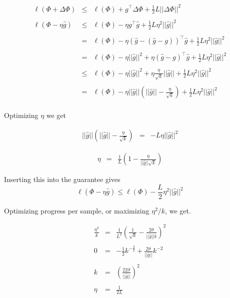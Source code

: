 {\begin{eqnarray*}
 \ell(\Phi + \Delta \Phi) & \leq &   \ell(\Phi) + g^\top \Delta \Phi + \frac{1}{2} L ||\Delta \Phi||^2 \\
  \\
\ell(\Phi - \eta\widehat{g}) & \leq & \ell(\Phi) - \eta g^\top \widehat{g} + \frac{1}{2}L \eta^2 ||\widehat{g}||^2\\
  \\
  & = &  \ell(\Phi) - \eta (\widehat{g} - (\widehat{g} -g))^\top \widehat{g} + \frac{1}{2}L\eta^2 ||\widehat{g}||^2 \\
  \\
  & = &  \ell(\Phi) - \eta ||\widehat{g}||^2 + \eta(\widehat{g} -g)^\top \widehat{g} + \frac{1}{2}L \eta^2 ||\widehat{g}||^2 \\
  \\
  & \leq &  \ell(\Phi) - \eta ||\widehat{g}||^2 + \eta\frac{\eta}{\sqrt{k}}||\widehat{g}|| + \frac{1}{2}L \eta^2 ||\widehat{g}||^2 \\
  \\
  & = & \ell(\Phi) - \eta ||\widehat{g}||\left(||\widehat{g}|| - \frac{\eta}{\sqrt{k}} \right)  + \frac{1}{2}L \eta^2 ||\widehat{g}||^2 \\
\end{eqnarray*}


Optimizing $\eta$ we get

\begin{eqnarray*}
 ||\widehat{g}||\left(||\widehat{g}|| - \frac{\eta}{\sqrt{k}} \right) & = & - L \eta ||\widehat{g}||^2
\end{eqnarray*}


\begin{eqnarray*}
\eta & = & \frac{1}{L}\left(1 - \frac{\eta}{||\widehat{g}||\sqrt{k}}\right)
\end{eqnarray*}

\vfill
Inserting this into the guarantee gives
$$\ell(\Phi - \eta \widehat{g}) \leq \ell(\Phi) - \frac{L}{2}\eta^2||\widehat{g}||^2$$


Optimizing progress per sample, or maximizing $\eta^2/k$, we get.

\begin{eqnarray*}
\frac{\eta^2}{k} & = & \frac{1}{L^2}\left(\frac{1}{\sqrt{k}} - \frac{2\hat{\sigma}}{||\widehat{g}||k}\right)^2 \\
\\
0 & = &  - \frac{1}{2} k^{-\frac{3}{2}} + \frac{2\hat{\sigma}}{||\widehat{g}||} k^{-2} \nonumber \\
\\
k & = & \left(\frac{22\hat{\sigma}}{||\widehat{g}||}\right)^2 \\
\\
\eta & = & \frac{1}{2L}
\end{eqnarray*}


} 

